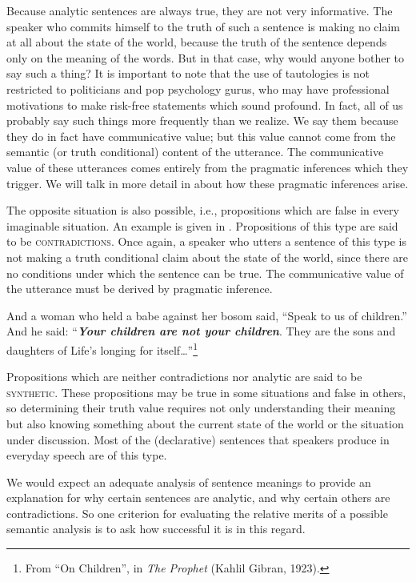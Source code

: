 Because analytic sentences are always true, they are not very informative. The speaker who commits himself to the truth of such a sentence is making no claim at all about the state of the world, because the truth of the sentence depends only on the meaning of the words. But in that case, why would anyone bother to say such a thing? It is important to note that the use of tautologies is not restricted to politicians and pop psychology gurus, who may have professional motivations to make risk-free statements which sound profound. In fact, all of us probably say such things more frequently than we realize. We say them because they do in fact have communicative value; but this value cannot come from the semantic (or truth conditional) content of the utterance. The communicative value of these utterances comes entirely from the pragmatic inferences which they trigger. We will talk in more detail in  about how these pragmatic inferences arise.



The opposite situation is also possible, i.e., propositions which are false in every imaginable situation. An example is given in . Propositions of this type are said to be \textsc{contradictions}. Once again, a speaker who utters a sentence of this type is not making a truth conditional claim about the state of the world, since there are no conditions under which the sentence can be true. The communicative value of the utterance must be derived by pragmatic inference.


\ea \label{ex:3.4}
And a woman who held a babe against her bosom said, “Speak to us of children.” And he said: “\textbf{\textit{Your children are not your children}}. They are the sons and daughters of Life’s longing for itself…”\footnote{From “On Children”, in \textit{The Prophet} (Kahlil Gibran, 1923).}
\z


Propositions which are neither contradictions nor analytic are said to be \textsc{synthetic}. These propositions may be true in some situations and false in others, so determining their truth value requires not only understanding their meaning but also knowing something about the current state of the world or the situation under discussion. Most of the (declarative) sentences that speakers produce in everyday speech are of this type.



We would expect an adequate analysis of sentence meanings to provide an explanation for why certain sentences are analytic, and why certain others are contradictions. So one criterion for evaluating the relative merits of a possible semantic analysis is to ask how successful it is in this regard.


